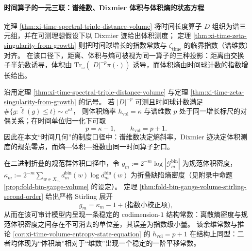 
\paragraph{时间算子的一元三联：谱维数、Dixmier 体积与体积熵的状态方程}
定理 \ref{thm:xi-time-spectral-triple-distance-volume} 将时间长度算子 \(D\) 组织为谱三元组，并在可测理想假设下以 Dixmier 迹给出体积测度；
定理 \ref{thm:xi-time-zeta-singularity-from-growth} 则把时间球增长的指数常数与 \(\zeta_{\mathrm{time}}\) 的临界指数（谱维数）对齐。
在该口径下，距离、体积与熵可被视为同一算子的三种投影：距离由交换子半范数诱导，体积由 \(\mathrm{Tr}_\omega(|D|^{-p}\pi(\cdot))\) 诱导，而体积熵由时间球计数的指数增长给出。

\begin{corollary}[体积熵—谱维数的状态方程：\texorpdfstring{$h_{\mathrm{vol}}=p+1$}{h_vol=p+1}]\label{cor:xi-time-volume-entropy-state-equation}
沿用定理 \ref{thm:xi-time-spectral-triple-distance-volume} 与定理 \ref{thm:xi-time-zeta-singularity-from-growth} 的记号。
若 \(|D|^{-p}\) 可测且时间球计数满足
\(
\#\{g:\widetilde\ell(g)\le t\}\sim e^{\kappa t}
\)，
则体积熵率 \(h_{\mathrm{vol}}=\kappa\) 与谱维数 \(p\) 处于同一增长标尺的对偶关系；在时间单位归一化下可取
\[
\boxed{\;p=\kappa-1,\qquad h_{\mathrm{vol}}=p+1.\;}
\]
因此在本文“时间几何”的制度口径中：谱维数决定熵斜率，Dixmier 迹决定体积测度的规范零点，而熵—体积—维数由同一时间算子封口。
\end{corollary}

\begin{remark}\label{rem:xi-stirling-codimension1}
在二进制折叠的规范群体积口径中，令
\(
g_m:=2^{-m}\log|\mathcal{G}^{\mathrm{bin}}_m|
\)
为规范体积密度，\(\kappa_m:=2^{-m}\sum_{w\in X_m} d_m^{\mathrm{bin}}(w)\log d_m^{\mathrm{bin}}(w)\) 为折叠缺陷熵密度（见附录中命题 \ref{prop:fold-bin-gauge-volume} 的设定）。
定理 \ref{thm:fold-bin-gauge-volume-stirling-second-order} 给出严格 Stirling 展开
\[
g_m=\kappa_m-1+\text{(指数小校正项)},
\]
从而在该可审计模型内呈现一条稳定的 codimension-\(1\) 结构常数：离散熵密度与规范体积密度之间存在不可消去的单位差，其误差为指数级小量。
该余维常数与推论 \ref{cor:xi-time-volume-entropy-state-equation} 的 \(h_{\mathrm{vol}}=p+1\) 在结构上同型：二者均体现为“体积熵”相对于“维数”出现一个稳定的一阶平移常数。
\end{remark}

